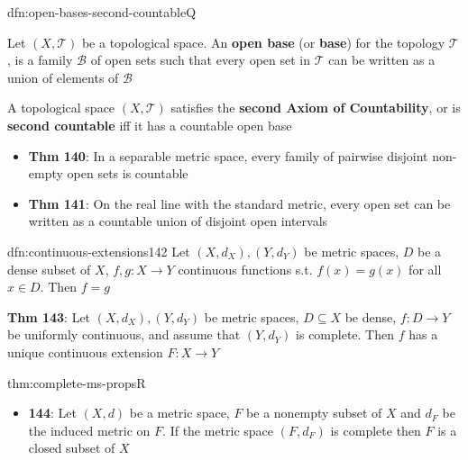 \documentclass[landscape, 8pt]{extarticle}
\begin{document}
\begin{multicols}{3}
\begin{dfn}{dfn:open-bases-second-countable}{Q}
    \vspace{-5pt}
    \vspace{-3pt}

    Let $(X, \mathcal{T})$ be a topological space. An \textbf{open base} (or \textbf{base}) for the topology $\mathcal{T}$, is a family $\mathcal{B}$ of open sets such that every open set in $\mathcal{T}$ can be written as a union of elements of $\mathcal{B}$

    \vspace{-3pt}

    A topological space $(X, \mathcal{T})$ satisfies the \textbf{second Axiom of Countability}, or is \textbf{second countable} iff it has a countable open base

    \vspace{-8pt}

    \begin{itemize}[leftmargin=*]
        \item \textbf{Thm 140}: In a separable metric space, every family of pairwise disjoint non-empty open sets is countable
        \item \textbf{Thm 141}: On the real line with the standard metric, every open set can be written as a countable union of disjoint open intervals
    \end{itemize}
\end{dfn}

\begin{thm}{dfn:continuous-extensions}{142}
    \vspace{-5pt}
    Let $(X, d_{X}), (Y, d_{Y})$ be metric spaces, $D$ be a dense subset of $X$, $f, g : X \to Y$ continuous functions s.t. $f(x) = g(x)$ for all $x\in D$. Then $f = g$

    \longrule{0.08ex}
    \textbf{Thm 143}: Let $(X, d_{X}), (Y, d_{Y})$ be metric spaces, $D \subseteq X$ be dense, $f : D \to Y$ be uniformly continuous, and assume that $(Y, d_{Y})$ is complete. Then $f$ has a unique continuous extension $F : X \to Y$
\end{thm}

\begin{thm}{thm:complete-ms-props}{R}
    \vspace{-5pt}
    \begin{itemize}[leftmargin=*]
        \item \textbf{144}: Let $(X, d)$ be a metric space, $F$ be a nonempty subset of $X$ and $d_{F}$ be the induced metric on $F$. If the metric space $(F, d_{F})$ is complete then $F$ is a closed subset of $X$


\end{itemize}
\end{thm}
\end{multicols}
\end{document}
